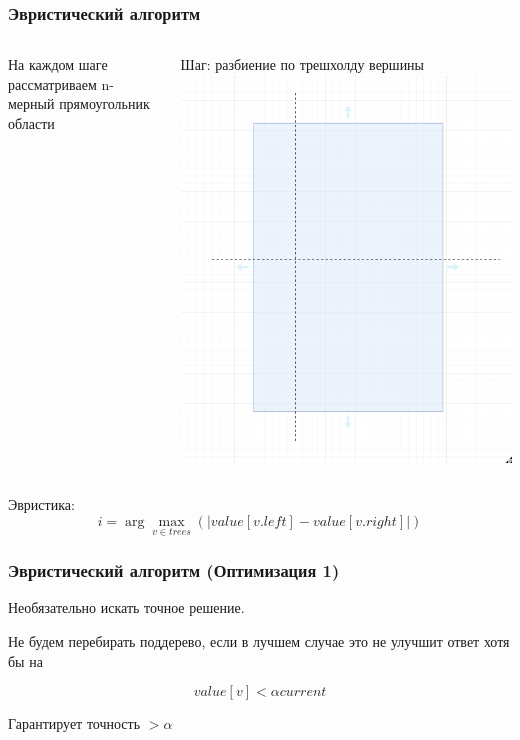 \documentclass{beamer}
\begin{document}
\begin{frame}
    \frametitle{Эвристический алгоритм}

    \begin{columns}
            На каждом шаге рассматриваем n-мерный прямоугольник области

            Шаг: разбиение по трешхолду вершины
            \includegraphics[width=\textwidth]{split.png}
    \end{columns}
    \vfill
    \pause{}
    Эвристика:
    \[
        i = \arg \max_{v \in trees}(|value[v.left] - value[v.right]|)
    \]
\end{frame}

\begin{frame}
    \frametitle{Эвристический алгоритм (Оптимизация 1)}
    Необязательно искать точное решение.

    \vspace{50px}
    Не будем перебирать поддерево, если в лучшем случае это не улучшит ответ хотя бы на \alpha{}

    \[
        value[v] < \alpha current
    \]

    Гарантирует точность \(>\alpha\)
\end{frame}
\end{document}
